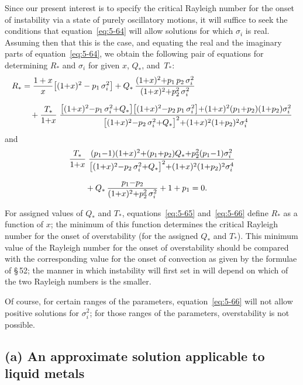 Since our present interest is to specify the critical Rayleigh number
for the onset of instability via a state of purely oscillatory motions, it
will suffice to seek the conditions that equation~\eqref{eq:5-64} will allow solutions
for which $\sigma_i$ is real. Assuming then that this is the case, and equating
the real and the imaginary parts of equation~\eqref{eq:5-64}, we obtain the following
pair of equations for determining $R_*$ and $\sigma_i$ for given $x$, $Q_*$, and~$T_*$:
\begin{align}
R_* &= \frac{1+x}{x}\bigl[(1{+}x)^2 - p_1\,\sigma_i^2\bigr]
+ Q_*\,\frac{(1{+}x)^2{+}p_1\,p_2\,\sigma_i^2}{(1{+}x)^2{+}p_2^2\,\sigma_i^2}
\notag\\[6pt]
&\quad{}+ \frac{T_*}{1{+}x}\;\frac{\bigl[(1{+}x)^2{-}p_1\,\sigma_i^2{+}Q_*\bigr]\bigl[(1{+}x)^2{-}p_2\,p_1\,\sigma_i^2\bigr]
{+}(1{+}x)^2(p_1{+}p_2)(1{+}p_2)\sigma_i^2}
{\bigl[(1{+}x)^2{-}p_2\,\sigma_i^2{+}Q_*\bigr]^2{+}(1{+}x)^2(1{+}p_2)^2\sigma_i^4}
\label{eq:5-65}
\end{align}
and
\begin{align}
&\frac{T_*}{1{+}x}\;\frac{(p_1{-}1)(1{+}x)^2{+}(p_1{+}p_2)Q_*{+}p_2^2(p_1{-}1)\sigma_i^2}
{\bigl[(1{+}x)^2{-}p_2\,\sigma_i^2{+}Q_*\bigr]^2{+}(1{+}x)^2(1{+}p_2)^2\sigma_i^4}
\notag\\[6pt]
&\qquad{}+ Q_*\,\frac{p_1{-}p_2}{(1{+}x)^2{+}p_2^2\,\sigma_i^2}
+ 1 + p_1 = 0.
\label{eq:5-66}
\end{align}

For assigned values of $Q_*$ and $T_*$, equations~\eqref{eq:5-65} and~\eqref{eq:5-66} define $R_*$
as a function of $x$; the minimum of this function determines the critical
Rayleigh number for the onset of overstability (for the assigned $Q_*$ and
$T_*$). This minimum value of the Rayleigh number for the onset of over\-stability should be compared with the corresponding value for the onset
of convection as given by the formulae of \S\,52; the manner in which
instability will first set in will depend on which of the two Rayleigh
numbers is the smaller.

Of course, for certain ranges of the parameters, equation~\eqref{eq:5-66} will
not allow positive solutions for $\sigma_i^2$; for those ranges of the parameters,
overstability is not possible.

\subsection*{(a) An approximate solution applicable to liquid metals}

